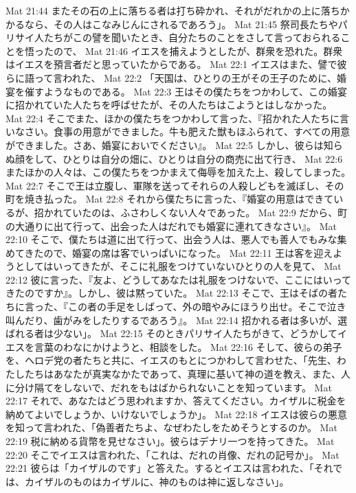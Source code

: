 Mat 21:44  またその石の上に落ちる者は打ち砕かれ、それがだれかの上に落ちかかるなら、その人はこなみじんにされるであろう」。
Mat 21:45  祭司長たちやパリサイ人たちがこの譬を聞いたとき、自分たちのことをさして言っておられることを悟ったので、
Mat 21:46  イエスを捕えようとしたが、群衆を恐れた。群衆はイエスを預言者だと思っていたからである。
Mat 22:1  イエスはまた、譬で彼らに語って言われた、
Mat 22:2  「天国は、ひとりの王がその王子のために、婚宴を催すようなものである。
Mat 22:3  王はその僕たちをつかわして、この婚宴に招かれていた人たちを呼ばせたが、その人たちはこようとはしなかった。
Mat 22:4  そこでまた、ほかの僕たちをつかわして言った、『招かれた人たちに言いなさい。食事の用意ができました。牛も肥えた獣もほふられて、すべての用意ができました。さあ、婚宴においでください』。
Mat 22:5  しかし、彼らは知らぬ顔をして、ひとりは自分の畑に、ひとりは自分の商売に出て行き、
Mat 22:6  またほかの人々は、この僕たちをつかまえて侮辱を加えた上、殺してしまった。
Mat 22:7  そこで王は立腹し、軍隊を送ってそれらの人殺しどもを滅ぼし、その町を焼き払った。
Mat 22:8  それから僕たちに言った、『婚宴の用意はできているが、招かれていたのは、ふさわしくない人々であった。
Mat 22:9  だから、町の大通りに出て行って、出会った人はだれでも婚宴に連れてきなさい』。
Mat 22:10  そこで、僕たちは道に出て行って、出会う人は、悪人でも善人でもみな集めてきたので、婚宴の席は客でいっぱいになった。
Mat 22:11  王は客を迎えようとしてはいってきたが、そこに礼服をつけていないひとりの人を見て、
Mat 22:12  彼に言った、『友よ、どうしてあなたは礼服をつけないで、ここにはいってきたのですか』。しかし、彼は黙っていた。
Mat 22:13  そこで、王はそばの者たちに言った、『この者の手足をしばって、外の暗やみにほうり出せ。そこで泣き叫んだり、歯がみをしたりするであろう』。
Mat 22:14  招かれる者は多いが、選ばれる者は少ない」。
Mat 22:15  そのときパリサイ人たちがきて、どうかしてイエスを言葉のわなにかけようと、相談をした。
Mat 22:16  そして、彼らの弟子を、ヘロデ党の者たちと共に、イエスのもとにつかわして言わせた、「先生、わたしたちはあなたが真実なかたであって、真理に基いて神の道を教え、また、人に分け隔てをしないで、だれをもはばかられないことを知っています。
Mat 22:17  それで、あなたはどう思われますか、答えてください。カイザルに税金を納めてよいでしょうか、いけないでしょうか」。
Mat 22:18  イエスは彼らの悪意を知って言われた、「偽善者たちよ、なぜわたしをためそうとするのか。
Mat 22:19  税に納める貨幣を見せなさい」。彼らはデナリ一つを持ってきた。
Mat 22:20  そこでイエスは言われた、「これは、だれの肖像、だれの記号か」。
Mat 22:21  彼らは「カイザルのです」と答えた。するとイエスは言われた、「それでは、カイザルのものはカイザルに、神のものは神に返しなさい」。
